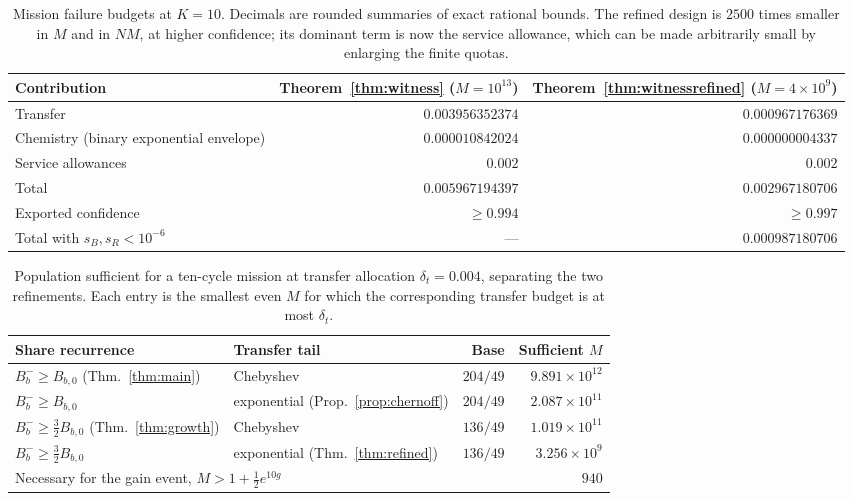 \documentclass[11pt,a4paper]{article}
\theoremstyle{plain}
\theoremstyle{definition}
\theoremstyle{remark}
\begin{document}
\begin{table}[tb]
\centering\small
\caption{Mission failure budgets at $K=10$. Decimals are rounded summaries of
exact rational bounds. The refined design is $2500$ times smaller in $M$ and in
$NM$, at higher confidence; its dominant term is now the service allowance,
which can be made arbitrarily small by enlarging the finite quotas.}
\label{tab:budget}
\begin{tabular}{lrr}
\toprule
Contribution & Theorem~\ref{thm:witness} ($M=10^{13}$) & Theorem~\ref{thm:witnessrefined} ($M=4\times10^{9}$)\\
\midrule
Transfer & $0.003956352374$ & $0.000967176369$\\
Chemistry (binary exponential envelope) & $0.000010842024$ & $0.000000004337$\\
Service allowances & $0.002$ & $0.002$\\
\midrule
Total & $0.005967194397$ & $0.002967180706$\\
Exported confidence & $\ge0.994$ & $\ge0.997$\\
Total with $s_B,s_R<10^{-6}$ & --- & $0.000987180706$\\
\bottomrule
\end{tabular}
\end{table}

\begin{table}[tb]
\centering\small
\caption{Population sufficient for a ten-cycle mission at transfer allocation
$\delta_t=0.004$, separating the two refinements. Each entry is the smallest
even $M$ for which the corresponding transfer budget is at most $\delta_t$.}
\label{tab:combinations}
\begin{tabular}{llrr}
\toprule
Share recurrence & Transfer tail & Base & Sufficient $M$\\
\midrule
$B_b^-\ge B_{b,0}$ (Thm.~\ref{thm:main}) & Chebyshev & $204/49$ & $9.891\times10^{12}$\\
$B_b^-\ge B_{b,0}$ & exponential (Prop.~\ref{prop:chernoff}) & $204/49$ & $2.087\times10^{11}$\\
$B_b^-\ge\frac32B_{b,0}$ (Thm.~\ref{thm:growth}) & Chebyshev & $136/49$ & $1.019\times10^{11}$\\
$B_b^-\ge\frac32B_{b,0}$ & exponential (Thm.~\ref{thm:refined}) & $136/49$ & $3.256\times10^{9}$\\
\midrule
\multicolumn{3}{l}{Necessary for the gain event, $M>1+\frac12e^{10g}$} & $940$\\
\bottomrule
\end{tabular}
\end{table}
\end{document}
